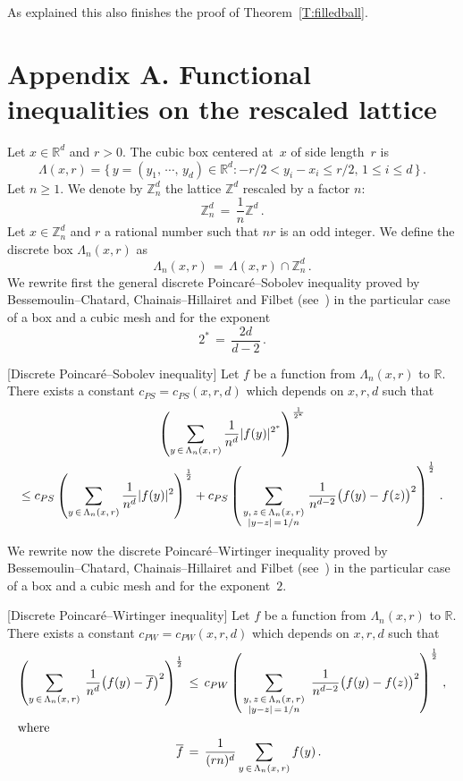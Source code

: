 \documentclass[AHL, Unicode, longabstracts, published]{cedram}
\newcommand{\tatop}[2]{\genfrac{}{}{0pt}{1}{#1}{#2}}
\newcommand*\Z {{\mathbb Z}}
\newcommand*\Zd {{\mathbb Z^d}}
\newcommand*\Rd {{\mathbb R^d}}
\newcommand*\Znd {{\mathbb Z_n^d}}
\newcommand*\R{\mathbb{R}}
\newcommand*\baf {{\overline f}}
\newcommand*\La {{\Lambda}}
\begin{document}
As explained this also finishes the proof of Theorem~\ref{T:filledball}.



\appendix
\addtocounter{section}{1}
\section*{Appendix A. Functional inequalities on the rescaled lattice}
Let $x\in\Rd$ and $r>0$. The cubic box centered at~$x$ of side length~$r$ is
\[
\Lambda(x,r) = \big\{\,y=(y_1,\,\cdots,\,y_d)\in\R^d: -r/2<y_i-x_i\leq r/2,
\,1\leq i\leq d\,\big\}\,.
\]
Let $n\geq 1$. We denote by $\Znd$ the lattice $\Zd$ rescaled by a factor $n$:
\[
\Znd\,=\,\frac{1}{n}\Z^d\,.
\]
Let $x\in\Znd$ and $r$ a rational number such that $nr$ is an odd integer. We define the discrete box $\La_n(x,r)$ as
\[
\La_n(x,r)\,=\,\La(x,r)\cap\Znd\,.
\]
We rewrite first the general discrete Poincaré--Sobolev inequality proved by Bessemou\-lin--Chatard, Chainais--Hillairet and Filbet (see~\cite[Theorem~$3$]{BCHF}) in the particular case of a box and a cubic mesh and for the exponent
\[
2^*\,=\,\frac{2d}{d-2}\,.
\]
\begin{theo}\label{PS}[Discrete Poincaré--Sobolev inequality]
Let $f$ be a function from $\La_n(x,r)$ to $\R$. There exists a constant $c_{PS}=c_{PS}(x,r,d)$ which depends on $x,r,d$ such that
\begin{multline*}
\left(\sum_{y\,\in\,\Lambda_n(x,\,r)}\frac{1}{n^d}|f(y)|^{2^*}\right)^{\frac{1}{2^*}}
\\
\leq c_{PS}\left(\sum_{y\,\in\,\Lambda_n(x,\,r)}\frac{1}{n^d}|f(y)|^{2}\right)^{\frac{1}{2}} +c_{PS}\left(\sum_{\tatop{y,\,z\,\in\,\Lambda_n(x,\,r)}{|y-z|\,=\,1/n}}
\frac{1}{n^{d-2}}\big(f(y)-f(z)\big)^{2}\right)^{\frac{1}{2}}\,.
\end{multline*}
\end{theo}

We rewrite now the discrete Poincaré--Wirtinger inequality proved by Bessemoulin--Chatard, Chainais--Hillairet and Filbet (see~\cite[Theorem~$5$]{BCHF}) in the particular case of a box and a cubic mesh and for the exponent~$2$.
\begin{theo}\label{PW}[Discrete Poincaré--Wirtinger inequality]
Let $f$ be a function from $\La_n(x,r)$ to $\R$. There exists a constant $c_{PW}=c_{PW}(x,r,d)$ which depends on $x,r,d$ such that
\begin{align*}
\left(\sum_{y\,\in\,\Lambda_n(x,\,r)}\:\frac{1}{n^d}\big(f(y)-\baf\big)^{2}\right)^{\frac{1}{2}}
\,&\leq\, c_{PW}\left(
\sum_{\tatop{y,\,z\,\in\,\Lambda_n(x,\,r)}{|y-z|\,=\,1/n}}\:
\frac{1}{n^{d-2}}\big(f(y)-f(z)\big)^{2}\right)^{\frac{1}{2}}\,,\\
\intertext{where}
\baf\,&=\,
\frac{1}{(rn)^d}
\sum_{y\,\in\,\Lambda_n(x,\,r)}
f(y)\,.
\end{align*}
\end{theo}
\end{document}
